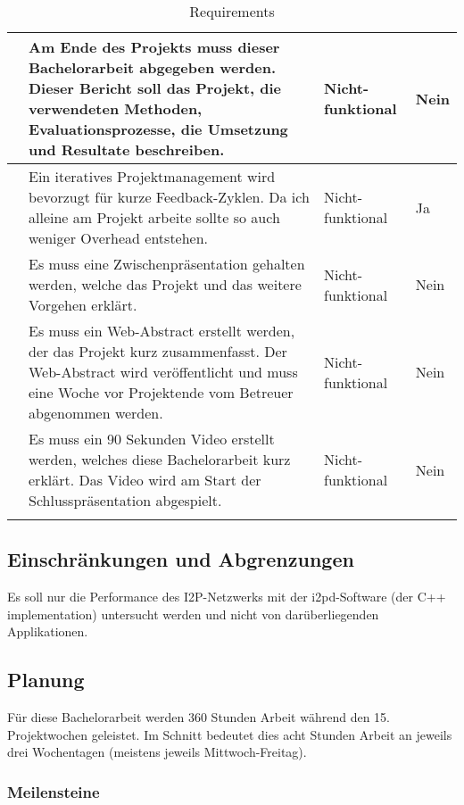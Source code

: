 \begin{longtable}{N p{8.5cm} l l}
      & Am Ende des Projekts muss dieser Bachelorarbeit abgegeben werden. Dieser Bericht soll das Projekt, die verwendeten Methoden, Evaluationsprozesse, die Umsetzung und Resultate beschreiben.
                & Nicht-funktional & Nein \\ \midrule
      & Ein iteratives Projektmanagement wird bevorzugt für kurze Feedback-Zyklen. Da ich alleine am Projekt arbeite sollte so auch weniger Overhead entstehen. & Nicht-funktional & Ja \\ \midrule
      & Es muss eine Zwischenpräsentation gehalten werden, welche das Projekt und das weitere Vorgehen erklärt.
                & Nicht-funktional & Nein \\ \midrule
      & Es muss ein Web-Abstract erstellt werden, der das Projekt kurz zusammenfasst. Der Web-Abstract wird veröffentlicht und muss eine Woche vor Projektende vom Betreuer abgenommen werden.
                & Nicht-funktional & Nein \\ \midrule
      & Es muss ein 90 Sekunden Video erstellt werden, welches diese Bachelorarbeit kurz erklärt. Das Video wird am Start der Schlusspräsentation abgespielt.
                & Nicht-funktional & Nein \\ \midrule
    \bottomrule
    \caption{Requirements}\label{tab:requirements}
\end{longtable}


\subsection{Einschränkungen und Abgrenzungen}

Es soll nur die Performance des I2P-Netzwerks mit der i2pd-Software (der C++ implementation) untersucht werden und nicht von darüberliegenden Applikationen.


\subsection{Planung}
\label{sec:Planung}

Für diese Bachelorarbeit werden 360 Stunden Arbeit während den 15. Projektwochen geleistet.
Im Schnitt bedeutet dies acht Stunden Arbeit an jeweils drei Wochentagen (meistens jeweils Mittwoch-Freitag).


\subsubsection{Meilensteine}
\label{sec:meilensteine}

